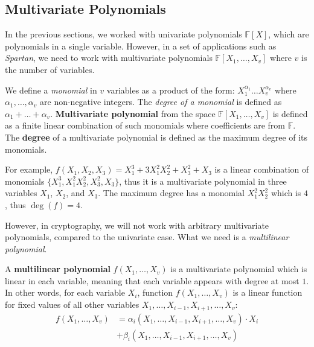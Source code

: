 \documentclass[../../book.tex]{subfiles}
\begin{document}
\subsection{Multivariate Polynomials}

In the previous sections, we worked with univariate polynomials $\mathbb{F}[X]$,
which are polynomials in a single variable. However, in a set of applications
such as \textit{Spartan}, we need to work with multivariate polynomials
$\mathbb{F}[X_1,\dots,X_v]$ where $v$ is the number of variables.

\begin{definition}
    We define a \textit{monomial} in $v$ variables as a product of the form:
    $X_1^{\alpha_1}\dots X_v^{\alpha_v}$ where $\alpha_1,\dots,\alpha_v$ are
    non-negative integers. The \textit{degree of a monomial} is defined as
    $\alpha_1+\dots+\alpha_v$. \textbf{Multivariate polynomial} from the space
    $\mathbb{F}[X_1,\dots,X_v]$ is defined as a finite linear combination of
    such monomials where coefficients are from $\mathbb{F}$. The \textbf{degree}
    of a multivariate polynomial is defined as the maximum degree of its
    monomials.
\end{definition}

\begin{example}
    For example, $f(X_1,X_2,X_3)=X_1^3 + 3X_1^2X_2^2 + X_3^2 + X_3$ is a linear
    combination of monomials $\{X_1^3,X_1^2X_2^2,X_3^2,X_3\}$, thus it is a
    multivariate polynomial in three variables $X_1$, $X_2$, and $X_3$. The
    maximum degree has a monomial $X_1^2X_2^2$ which is $4$, thus $\deg(f) = 4$.
\end{example}

However, in cryptography, we will not work with arbitrary multivariate
polynomials, compared to the univariate case. What we need is a 
\textit{multilinear polynomial}.
\begin{definition}
    A \textbf{multilinear polynomial} $f(X_1,\dots,X_v)$ is a multivariate
    polynomial which is linear in each variable, meaning that each variable
    appears with degree at most $1$. In other words, for each variable
    $X_i$, function $f(X_1,\dots,X_v)$ is a linear function for fixed 
    values of all other variables $X_1,\dots,X_{i-1},X_{i+1},\dots,X_v$:
    \begin{align*}
        f(X_1,\dots,X_v) &= \alpha_i(X_1,\dots,X_{i-1},X_{i+1},\dots,X_v) \cdot X_i \\
        &+ \beta_i(X_1,\dots,X_{i-1},X_{i+1},\dots,X_v)
    \end{align*}
\end{definition}
\end{document}
